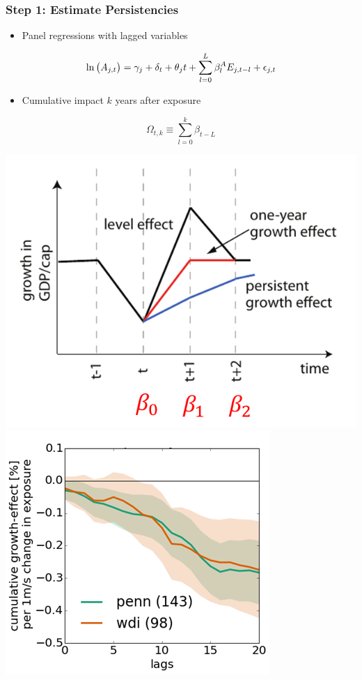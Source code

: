 \documentclass[
c,
11pt,
aspectratio=169, %
final,
]{beamer}
\begin{document}
\begin{frame}
  \frametitle{Step 1: Estimate Persistencies}
  \begin{minipage}[r]{.6\linewidth}
    \vspace{0pt}
  \begin{itemize}
  \item Panel regressions with lagged variables
  \end{itemize}
  \begin{equation*}
    \ln\big(A_{j,t} \big) = \gamma_j + \delta_{t} + \theta_j t + \sum_{l=0}^{L}\beta^A_{l}E_{j,t-l}+\epsilon_{j,t}
  \end{equation*}
  \begin{itemize}
  \item Cumulative impact $k$ years after exposure
  \end{itemize}
  \begin{equation*}
    \Omega_{t,k}\equiv\sum_{l=0}^{k}\beta_{t-L}
  \end{equation*}
\end{minipage}\hfill
\begin{minipage}[r]{.39\linewidth}
    \vspace{-30pt}
  \centering
  \includegraphics[width=.75\textwidth]{figures/sketch_let_effect}
  \vfill
  \includegraphics[width=.75\textwidth]{figures/ind_windspeed}
\end{minipage}
\end{frame}
\end{document}
